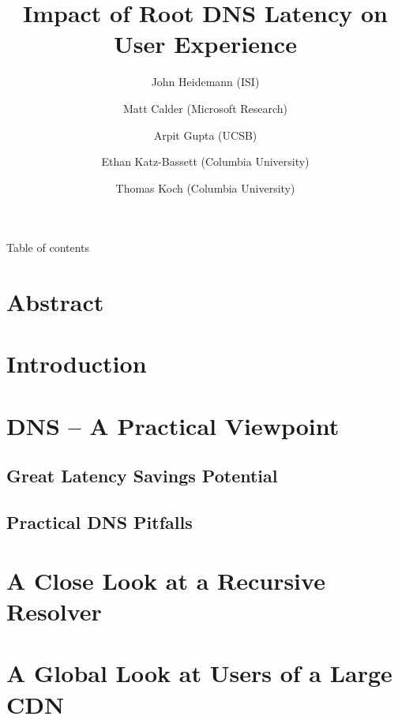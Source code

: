 \documentclass[sigconf,nonacm,10pt]{acmart}
\title{Impact of Root DNS Latency on User Experience}
\author{
            John Heidemann (ISI)
         \and 
            Matt Calder (Microsoft Research)
         \and 
            Arpit Gupta (UCSB)
         \and 
            Ethan Katz-Bassett (Columbia University)
         \and 
            Thomas Koch (Columbia University)
        }
\date{}
\begin{document}
\maketitle

\iffalse

Table of contents

\section*{Abstract}\label{abstract}

\section{Introduction}\label{introduction}

\section{DNS -- A Practical Viewpoint}\label{dns-a-practical-viewpoint}

\subsection{Great Latency Savings
Potential}\label{great-latency-savings-potential}

\subsection{Practical DNS Pitfalls}\label{practical-dns-pitfalls}

\section{A Close Look at a Recursive
Resolver}\label{a-close-look-at-a-recursive-resolver}

\section{A Global Look at Users of a Large
CDN}\label{a-global-look-at-users-of-a-large-cdn}
\end{document}
